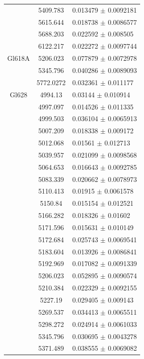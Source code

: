 \begin{longtable}{|c|c|l|}
 & 5409.783 & 0.013479 $\pm$ 0.0092181 \\       
 & 5615.644 & 0.018738 $\pm$ 0.0086577 \\       
 & 5688.203 & 0.022592 $\pm$ 0.008505 \\        
 & 6122.217 & 0.022272 $\pm$ 0.0097744 \\       
\hline                                          
Gl618A & 5206.023 & 0.077879 $\pm$ 0.0072978 \\ 
 & 5345.796 & 0.040286 $\pm$ 0.0089093 \\       
 & 5772.0272 & 0.032361 $\pm$ 0.011177 \\       
\hline                                          
Gl628 & 4994.13 & 0.03144 $\pm$ 0.010914 \\     
 & 4997.097 & 0.014526 $\pm$ 0.011335 \\        
 & 4999.503 & 0.036104 $\pm$ 0.0065913 \\       
 & 5007.209 & 0.018338 $\pm$ 0.009172 \\        
 & 5012.068 & 0.01561 $\pm$ 0.012713 \\         
 & 5039.957 & 0.021099 $\pm$ 0.0098568 \\       
 & 5064.653 & 0.016643 $\pm$ 0.0092785 \\       
 & 5083.339 & 0.020662 $\pm$ 0.0078973 \\       
 & 5110.413 & 0.01915 $\pm$ 0.0061578 \\        
 & 5150.84 & 0.015154 $\pm$ 0.012521 \\         
 & 5166.282 & 0.018326 $\pm$ 0.01602 \\         
 & 5171.596 & 0.015631 $\pm$ 0.010149 \\        
 & 5172.684 & 0.025743 $\pm$ 0.0069541 \\       
 & 5183.604 & 0.013926 $\pm$ 0.0086841 \\       
 & 5192.969 & 0.017082 $\pm$ 0.0091339 \\       
 & 5206.023 & 0.052895 $\pm$ 0.0090574 \\       
 & 5210.384 & 0.022329 $\pm$ 0.0092155 \\       
 & 5227.19 & 0.029405 $\pm$ 0.009143 \\         
 & 5269.537 & 0.034413 $\pm$ 0.0065511 \\       
 & 5298.272 & 0.024914 $\pm$ 0.0061033 \\       
 & 5345.796 & 0.030695 $\pm$ 0.0043278 \\       
 & 5371.489 & 0.038555 $\pm$ 0.0069082 \\       

\end{longtable}
